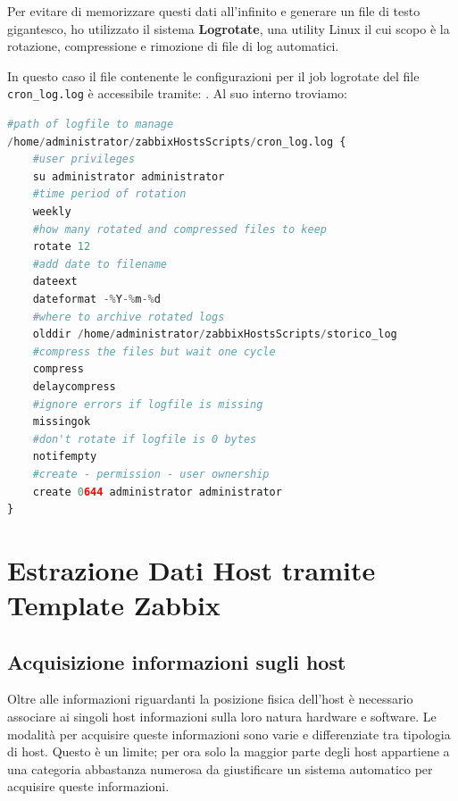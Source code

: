 \documentclass[12pt, a4paper]{report}
\newcommand{\inlinecode}[1]{\colorbox{backcolour}{\texttt{\detokenize{#1}}}}%
\begin{document}
Per evitare di memorizzare questi dati all'infinito e generare un file di testo gigantesco, 
ho utilizzato il sistema \textbf{Logrotate}, una utility Linux il cui scopo è la rotazione, 
compressione e rimozione di file di log automatici.

In questo caso il file contenente le configurazioni per il job logrotate del file \lstinline|cron_log.log| è accessibile tramite: \inlinecode{nano /etc/logrotate.d/zabbix_scripts}.
Al suo interno troviamo: 
\begin{lstlisting}[language=python, caption=Configurazione logrotate per \lstinline|cron_log.log|]
#path of logfile to manage
/home/administrator/zabbixHostsScripts/cron_log.log {
    #user privileges
    su administrator administrator
    #time period of rotation
    weekly
    #how many rotated and compressed files to keep
    rotate 12
    #add date to filename
    dateext
    dateformat -%Y-%m-%d
    #where to archive rotated logs
    olddir /home/administrator/zabbixHostsScripts/storico_log
    #compress the files but wait one cycle
    compress
    delaycompress
    #ignore errors if logfile is missing
    missingok
    #don't rotate if logfile is 0 bytes
    notifempty
    #create - permission - user ownership 
    create 0644 administrator administrator
}
\end{lstlisting}

\chapter{Estrazione Dati Host tramite Template Zabbix}

\section{Acquisizione informazioni sugli host}
Oltre alle informazioni riguardanti la posizione fisica dell'host 
è necessario associare ai singoli host informazioni sulla loro natura hardware e software.
Le modalità per acquisire queste informazioni sono varie e differenziate tra tipologia di host.
Questo è un limite; per ora solo la maggior parte degli host appartiene a una categoria abbastanza 
numerosa da giustificare un sistema automatico per acquisire queste informazioni.
\end{document}

